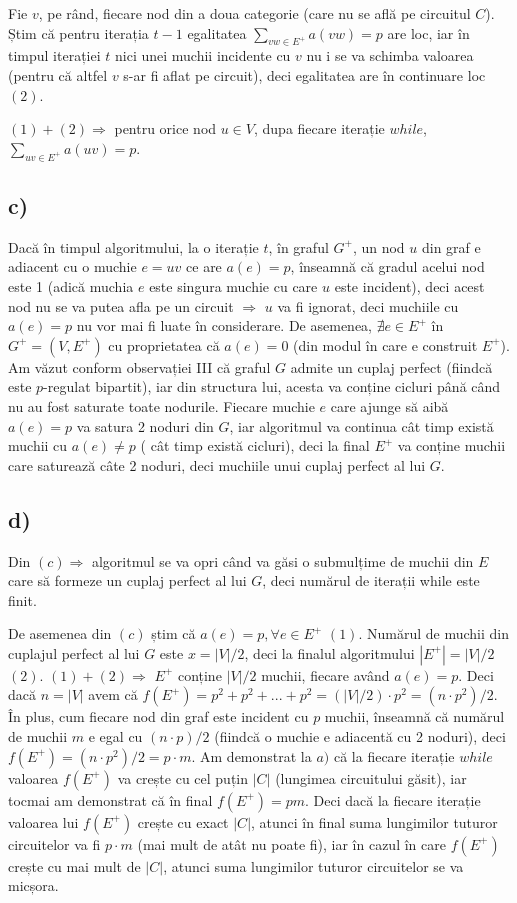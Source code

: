 \documentclass[a4paper,12pt]{article}
\begin{document}
Fie $v$, pe rând, fiecare nod din a doua categorie (care nu se află pe circuitul $C$). Știm că pentru iterația $t-1$ egalitatea $ \sum_{vw \in E^{+}} a(vw) = p $ are loc, iar în timpul iterației $t$ nici unei muchii incidente cu $v$ nu i se va schimba valoarea (pentru că altfel $v$ s-ar fi aflat pe circuit), deci egalitatea are în continuare loc $(2)$.

$(1) + (2) \Rightarrow$ pentru orice nod $u \in V$, dupa fiecare iterație $while$, $ \sum_{uv \in E^{+}} a(uv) = p $.

\subsection{c)}

Dacă în timpul algoritmului, la o iterație $t$, în graful $G^{+}$, un nod $u$ din graf e adiacent cu o muchie $e = uv$ ce are $a(e) = p$, înseamnă că gradul acelui nod este 1 (adică muchia $e$ este singura muchie cu care $u$ este incident), deci acest nod nu se va putea afla pe un circuit $\Rightarrow$ $u$ va fi ignorat, deci muchiile cu $a(e) = p$ nu vor mai fi luate în considerare. De asemenea, $ \nexists e \in E^{+}$ în $G^{+} = (V,E^{+})$ cu proprietatea că $a(e) = 0$ (din modul în care e construit $E^{+}$). Am văzut conform observației III că graful $G$ admite un cuplaj perfect (fiindcă este $p$-regulat bipartit), iar din structura lui, acesta va conține cicluri până când nu au fost saturate toate nodurile. Fiecare muchie $e$ care ajunge să aibă $a(e) = p$ va satura 2 noduri din $G$, iar algoritmul va continua cât timp există muchii cu $a(e) \neq p$ ( cât timp există cicluri), deci la final $E^{+}$ va conține muchii care saturează câte 2 noduri, deci muchiile unui cuplaj perfect al lui $G$.

\subsection{d)}

Din $(c) \Rightarrow $ algoritmul se va opri când va găsi o submulțime de muchii din $E$ care să formeze un cuplaj perfect al lui $G$, deci numărul de iterații while este finit. 

De asemenea din $(c)$ știm că $ a(e) = p, \forall e \in E^{+} $ $(1)$. Numărul de muchii din cuplajul perfect al lui $G$ este $x = |V|/2$, deci la finalul algoritmului $|E^{+}| = |V|/2$ $(2)$. $(1) + (2) \Rightarrow$ $E^{+}$ conține $|V|/2$ muchii, fiecare având $a(e) = p$. Deci dacă $n=|V|$ avem că $f(E^{+})= p^2 + p^2 + ... + p^2 = (|V|/2) \cdot p^2 = (n \cdot p^2)/2$. În plus, cum fiecare nod din graf este incident cu $p$ muchii, înseamnă că numărul de muchii $m$ e egal cu $(n \cdot p)/2$ (fiindcă o muchie e adiacentă cu 2 noduri), deci $f(E^{+})= (n \cdot p^2)/2 = p \cdot m$. Am demonstrat la $a)$ că la fiecare iterație $while$ valoarea $f(E^{+})$ va crește cu cel puțin $|C|$ (lungimea circuitului găsit), iar tocmai am demonstrat că în final $f(E^{+})=pm$. Deci dacă la fiecare iterație valoarea lui $f(E^{+})$ crește cu exact $|C|$, atunci în final suma lungimilor tuturor circuitelor va fi $p \cdot m$ (mai mult de atât nu poate fi), iar în cazul în care $f(E^{+})$ crește cu mai mult de $|C|$, atunci suma lungimilor tuturor circuitelor se va micșora. 
\end{document}
